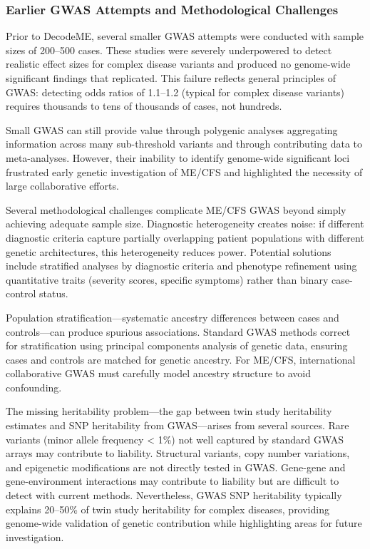 \subsubsection{Earlier GWAS Attempts and Methodological Challenges}

\begin{observation}
Prior to DecodeME, several smaller GWAS attempts were conducted with sample sizes of 200--500 cases. These studies were severely underpowered to detect realistic effect sizes for complex disease variants and produced no genome-wide significant findings that replicated. This failure reflects general principles of GWAS: detecting odds ratios of 1.1--1.2 (typical for complex disease variants) requires thousands to tens of thousands of cases, not hundreds.

Small GWAS can still provide value through polygenic analyses aggregating information across many sub-threshold variants and through contributing data to meta-analyses. However, their inability to identify genome-wide significant loci frustrated early genetic investigation of ME/CFS and highlighted the necessity of large collaborative efforts.
\end{observation}

Several methodological challenges complicate ME/CFS GWAS beyond simply achieving adequate sample size. Diagnostic heterogeneity creates noise: if different diagnostic criteria capture partially overlapping patient populations with different genetic architectures, this heterogeneity reduces power. Potential solutions include stratified analyses by diagnostic criteria and phenotype refinement using quantitative traits (severity scores, specific symptoms) rather than binary case-control status.

Population stratification---systematic ancestry differences between cases and controls---can produce spurious associations. Standard GWAS methods correct for stratification using principal components analysis of genetic data, ensuring cases and controls are matched for genetic ancestry. For ME/CFS, international collaborative GWAS must carefully model ancestry structure to avoid confounding.

The missing heritability problem---the gap between twin study heritability estimates and SNP heritability from GWAS---arises from several sources. Rare variants (minor allele frequency < 1\%) not well captured by standard GWAS arrays may contribute to liability. Structural variants, copy number variations, and epigenetic modifications are not directly tested in GWAS. Gene-gene and gene-environment interactions may contribute to liability but are difficult to detect with current methods. Nevertheless, GWAS SNP heritability typically explains 20--50\% of twin study heritability for complex diseases, providing genome-wide validation of genetic contribution while highlighting areas for future investigation.

